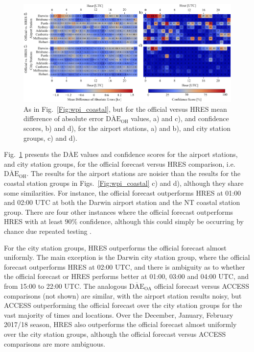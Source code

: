 \documentclass{ametsoc}
\begin{document}
\begin{figure}
\centering
\includegraphics[width=39pc]{airport_wpi.pdf}
\caption{As in Fig.~\ref{Fig:wpi_coastal}, but for the official versus HRES mean difference of absolute error $\overline{\text{DAE}}_\text{OH}$ values, a) and c), and confidence scores, b) and d), for the airport stations, a) and b), and city station groups, c) and d).}
\label{Fig:airport_wpi}
\end{figure}

Fig.~\ref{Fig:airport_wpi} presents the $\overline{\text{DAE}}$ values and confidence scores for the airport stations, and city station groups, for the official forecast versus HRES comparison, i.e.~$\overline{\text{DAE}}_\text{OH}$. The results for the airport stations are noisier than the results for the coastal station groups in Figs.~\ref{Fig:wpi_coastal} c) and d), although they share some similarities. For instance, the official forecast outperforms HRES at 01:00 and 02:00 UTC at both the Darwin airport station and the NT coastal station group. There are four other instances where the official forecast outperforms HRES with at least $90\%$ confidence, although this could simply be occurring by chance due repeated testing \citep[p. 178]{wilks11}.

For the city station groups, HRES outperforms the official forecast almost uniformly. The main exception is the Darwin city station group, where the official forecast outperforms HRES at 02:00 UTC, and there is ambiguity as to whether the official forecast or HRES performs better at 01:00, 03:00 and 04:00 UTC, and from 15:00 to 22:00 UTC. The analogous $\overline{\text{DAE}}_\text{OA}$ official forecast versus ACCESS comparisons (not shown) are similar, with the airport station results noisy, but ACCESS outperforming the official forecast over the city station groups for the vast majority of times and locations. Over the December, January, February 2017/18 season, HRES also outperforms the official forecast almost uniformly over the city station groups, although the official forecast versus ACCESS comparisons are more ambiguous. 
\end{document}
